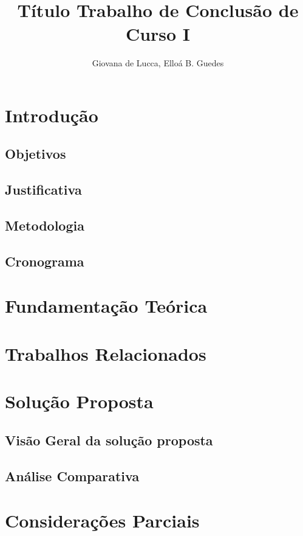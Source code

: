 \documentclass[12pt]{article}
\title{Título Trabalho de Conclusão de Curso I}
\author{Giovana de Lucca, Elloá B. Guedes}
\begin{document}
\maketitle

\section{Introdução}


\subsection{Objetivos}


\subsection{Justificativa} \label{sec:jutificativa}


\subsection{Metodologia} \label{sec:metodologia}


\subsection{Cronograma} \label{sec:cronograma}


\section{Fundamentação Teórica} \label{sec:fundamentacao}


\section{Trabalhos Relacionados} \label{sec:relacionados}


\section{Solução Proposta} \label{sec:solucao}


\subsection{Visão Geral da solução proposta} \label{sec:visaogeral}


\subsection{Análise Comparativa} \label{sec:analise}


\section{Considerações Parciais} \label{sec:consideracoes}





\end{document}
